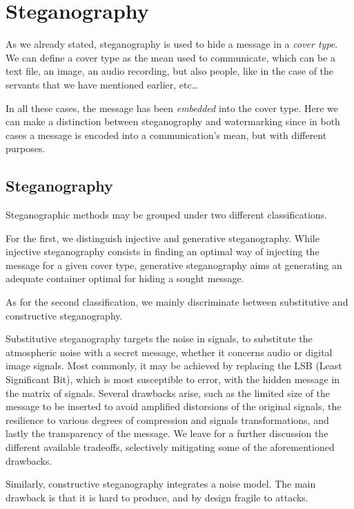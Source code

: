 \documentclass[../../main.tex]{subfiles}
\begin{document}
\section{Steganography}

As we already stated, steganography is used to hide a message in a
\emph{cover type}. We can define a cover type as the mean used to communicate,
which can be a text file, an image, an audio recording, but also people, like in
the case of the servants that we have mentioned earlier, etc\dots

In all these cases, the message has been \emph{embedded} into the cover type.
Here we can make a distinction between steganography and watermarking since in
both cases a message is encoded into a communication's mean, but with different
purposes.

\subsection{Steganography}

Steganographic methods may be grouped under two different classifications.

For the first, we distinguish injective and generative steganography.
While injective steganography consists in finding an optimal way of injecting
the message for a given cover type, generative steganography aims at generating
an adequate container optimal for hiding a sought message.

As for the second classification, we mainly discriminate between substitutive
and constructive steganography.

Substitutive steganography targets the noise in signals, to substitute the
atmospheric noise with a secret message, whether it concerns audio or digital
image signals.
Most commonly, it may be achieved by replacing the LSB (Least Significant Bit),
which is most susceptible to error, with the hidden message in the matrix of
signals.
Several drawbacks arise, such as the limited size of the message to be inserted
to avoid amplified distorsions of the original signals, the resilience to
various degrees of compression and signals transformations, and lastly the
transparency of the message.
We leave for a further discussion the different available tradeoffs, selectively
mitigating some of the aforementioned drawbacks. 

Similarly, constructive steganography integrates a noise model.
The main drawback is that it is hard to produce, and by design fragile to
attacks.

\pagebreak
\end{document}

